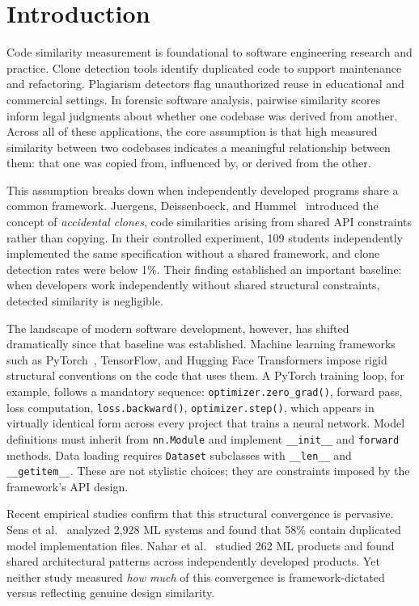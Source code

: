 \documentclass[smallextended,natbib]{svjour3}
\begin{document}
\section{Introduction}
\label{sec:intro}

Code similarity measurement is foundational to software engineering research and practice. Clone detection tools identify duplicated code to support maintenance and refactoring. Plagiarism detectors flag unauthorized reuse in educational and commercial settings. In forensic software analysis, pairwise similarity scores inform legal judgments about whether one codebase was derived from another. Across all of these applications, the core assumption is that high measured similarity between two codebases indicates a meaningful relationship between them: that one was copied from, influenced by, or derived from the other.

This assumption breaks down when independently developed programs share a common framework. Juergens, Deissenboeck, and Hummel~\citep{juergens2010} introduced the concept of \emph{accidental clones}, code similarities arising from shared API constraints rather than copying. In their controlled experiment, 109 students independently implemented the same specification without a shared framework, and clone detection rates were below 1\%. Their finding established an important baseline: when developers work independently without shared structural constraints, detected similarity is negligible.

The landscape of modern software development, however, has shifted dramatically since that baseline was established. Machine learning frameworks such as PyTorch~\citep{paszke2019}, TensorFlow, and Hugging Face Transformers impose rigid structural conventions on the code that uses them. A PyTorch training loop, for example, follows a mandatory sequence: \texttt{optimizer.zero\_grad()}, forward pass, loss computation, \texttt{loss.backward()}, \texttt{optimizer.step()}, which appears in virtually identical form across every project that trains a neural network. Model definitions must inherit from \texttt{nn.Module} and implement \texttt{\_\_init\_\_} and \texttt{forward} methods. Data loading requires \texttt{Dataset} subclasses with \texttt{\_\_len\_\_} and \texttt{\_\_getitem\_\_}. These are not stylistic choices; they are constraints imposed by the framework's API design.

Recent empirical studies confirm that this structural convergence is pervasive. Sens et al.~\citep{sens2025} analyzed 2,928 ML systems and found that 58\% contain duplicated model implementation files. Nahar et al.~\citep{nahar2023} studied 262 ML products and found shared architectural patterns across independently developed products. Yet neither study measured \emph{how much} of this convergence is framework-dictated versus reflecting genuine design similarity.
\end{document}
